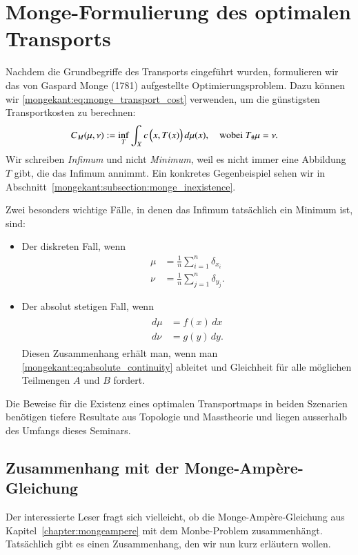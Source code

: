 %
%
%
%
\section{Monge-Formulierung des optimalen Transports
\label{mongekant:section:teil1}}

Nachdem die Grundbegriffe des Transports eingeführt wurden,
formulieren wir das von Gaspard Monge (1781) aufgestellte Optimierungsproblem.
Dazu können wir \eqref{mongekant:eq:monge_transport_cost} verwenden,
um die günstigsten Transportkosten zu berechnen:
\begin{align}
C_M(\mu, \nu)
&:=
\inf_{T}
\int_X c\,\Bigl(x, T(x)\Bigr)\, d\mu(x)
,\quad
\text{wobei } T_{\#}\mu=\nu
.
\label{mongekant:eq:monge_problem}
\end{align}
Wir schreiben \emph{Infimum} und nicht \emph{Minimum},
weil es nicht immer eine Abbildung $T$ gibt,
die das Infimum annimmt.
Ein konkretes Gegenbeispiel sehen wir in
Abschnitt~\ref{mongekant:subsection:monge_inexistence}.

Zwei besonders wichtige Fälle,
in denen das Infimum tatsächlich ein Minimum ist,
sind:
\begin{itemize}
\item Der diskreten Fall, wenn
\begin{align*}
\mu
&=
\frac{1}{n} \sum_{i=1}^n \delta_{x_i}
\\
\nu
&=
\frac{1}{n} \sum_{j=1}^n \delta_{y_j}
.
\end{align*}
\item Der absolut stetigen Fall, wenn
\begin{align}
\begin{aligned}
d\mu
&=
f(x)\, dx
\\
d\nu
&=
g(y)\, dy
.
\end{aligned}
\label{mongekant:eq:absolute_densities}
\end{align}
Diesen Zusammenhang erhält man,
wenn man \eqref{mongekant:eq:absolute_continuity} ableitet und
Gleichheit für alle möglichen Teilmengen $A$ und $B$ fordert.
\end{itemize}
Die Beweise für die Existenz eines optimalen Transportmaps in beiden Szenarien
benötigen tiefere Resultate aus Topologie und Masstheorie und
liegen ausserhalb des Umfangs dieses Seminars.

\subsection{Zusammenhang mit der Monge-Ampère-Gleichung}
Der interessierte Leser fragt sich vielleicht,
ob die Monge-Ampère-Gleichung aus Kapitel~\ref{chapter:mongeampere}
mit dem Monbe-Problem zusammenhängt.
Tatsächlich gibt es einen Zusammenhang,
den wir nun kurz erläutern wollen.

